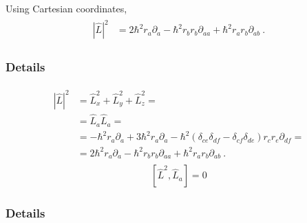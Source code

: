 \documentclass[letterpaper,10pt,english]{jupyterBook}
\begin{document}
\sphinxAtStartPar
{} Using Cartesian coordinates,
\begin{equation*}
\begin{split}\begin{aligned}
  |\hat{L}|^2 
  & = 2 \hbar^2 r_a \partial_a - \hbar^2 r_b r_b \partial_{aa} + \hbar^2 r_a r_b \partial_{ab} \ .
\end{aligned}\end{split}
\end{equation*}\subsubsection*{Details}
\begin{equation*}
\begin{split}\begin{aligned}
  |\hat{L}|^2 
  & = \hat{L}_x^2 + \hat{L}_y^2 + \hat{L}_z^2 = \\
  & = \hat{L}_a \hat{L}_a = \\
  & = -\hbar^2 r_a \partial_a + 3 \hbar^2 r_a \partial_a - \hbar^2 ( \delta_{ce} \delta_{df} - \delta_{cf} \delta_{de} ) r_c r_e \partial_{df} = \\
  & = 2 \hbar^2 r_a \partial_a - \hbar^2 r_b r_b \partial_{aa} + \hbar^2 r_a r_b \partial_{ab} \ .
\end{aligned}\end{split}
\end{equation*}
\sphinxAtStartPar
{}
\begin{equation*}
\begin{split}[ \hat{L}^2, \hat{L}_a ] = 0\end{split}
\end{equation*}\subsubsection*{Details}
\end{document}
